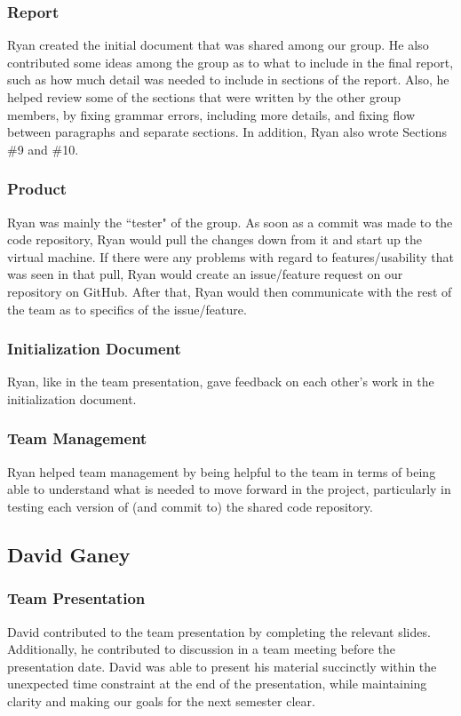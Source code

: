 \documentclass[12pt]{article}
\begin{document}
\begin{spacing}{1.5}
\subsubsection{Report}
Ryan created the initial document that was shared among our group. He also contributed some ideas among the group as to what to include in the final report, such as how much detail was needed to include in sections of the report. Also, he helped review some of the sections that were written by the other group members, by fixing grammar errors, including more details, and fixing flow between paragraphs and separate sections. In addition, Ryan also wrote Sections \#9 and \#10.
\subsubsection{Product}
Ryan was mainly the ``tester" of the group. As soon as a commit was made to the code repository, Ryan would pull the changes down from it and start up the virtual machine. If there were any problems with regard to features/usability that was seen in that pull, Ryan would create an issue/feature request on our repository on GitHub. After that, Ryan would then communicate with the rest of the team as to specifics of the issue/feature.
\subsubsection{Initialization Document}
Ryan, like in the team presentation, gave feedback on each other's work in the initialization document. 
\subsubsection{Team Management}
Ryan helped team management by being helpful to the team in terms of being able to understand what is needed to move forward in the project, particularly in testing each version of (and commit to) the shared code repository. 

\clearpage

\subsection{David Ganey}
\subsubsection{Team Presentation}
David contributed to the team presentation by completing the relevant slides. Additionally, he contributed to discussion in a team meeting before the presentation date. David was able to present his material succinctly within the unexpected time constraint at the end of the presentation, while maintaining clarity and making our goals for the next semester clear.

\end{spacing}
\end{document}
